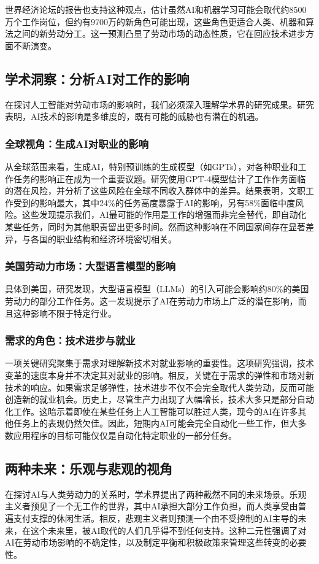 \documentclass[11pt]{article}
\begin{document}
世界经济论坛的报告也支持这种观点，估计虽然AI和机器学习可能会取代约8500万个工作岗位，但约有9700万的新角色可能出现，这些角色更适合人类、机器和算法之间的新劳动分工。这一预测凸显了劳动市场的动态性质，它在回应技术进步方面不断演变。

\subsection{学术洞察：分析AI对工作的影响}

在探讨人工智能对劳动市场的影响时，我们必须深入理解学术界的研究成果。研究表明，AI技术的影响是多维度的，既有可能的威胁也有潜在的机遇。

\subsubsection{全球视角：生成AI对职业的影响}
从全球范围来看，生成AI，特别预训练的生成模型（如GPTs），对各种职业和工作任务的影响正在成为一个重要议题。研究使用GPT-4模型估计了工作作务面临的潜在风险，并分析了这些风险在全球不同收入群体中的差异。结果表明，文职工作受到的影响最大，其中24\%的任务高度暴露于AI的影响，另有58\%面临中度风险。这些发现提示我们，AI最可能的作用是工作的增强而非完全替代，即自动化某些任务，同时为其他职责留出更多时间。然而这种影响在不同国家间存在显著差异，与各国的职业结构和经济环境密切相关。

\subsubsection{美国劳动力市场：大型语言模型的影响}
具体到美国，研究发现，大型语言模型（LLMs）的引入可能会影响约80\%的美国劳动力的部分工作任务。这一发现提示了AI在劳动力市场上广泛的潜在影响，而且这种影响不限于特定行业。

\subsubsection{需求的角色：技术进步与就业}
一项关键研究聚集于需求对理解新技术对就业影响的重要性。这项研究强调，技术变革的速度本身并不决定其对就业的影响。相反，关键在于需求的弹性和市场对新技术的响应。如果需求足够弹性，技术进步不仅不会完全取代人类劳动，反而可能创造新的就业机会。历史上，尽管生产力出现了大幅增长，技术大多只是部分自动化工作。这暗示着即使在某些任务上人工智能可以胜过人类，现今的AI在许多其他任务上的表现仍然欠佳。因此，短期内AI可能会完全自动化一些工作，但大多数应用程序的目标可能仅仅是自动化特定职业的一部分任务。

\subsection{两种未来：乐观与悲观的视角}
在探讨AI与人类劳动力的关系时，学术界提出了两种截然不同的未来场景。乐观主义者预见了一个无工作的世界，其中AI承担大部分工作负担，而人类享受由普遍支付支撑的休闲生活。相反，悲观主义者则预测一个由不受控制的AI主导的未来，在这个未来里，被AI取代的人们几乎得不到任何支持。这种二元性强调了对AI在劳动市场影响的不确定性，以及制定平衡和积极政策来管理这些转变的必要性。
\end{document}
